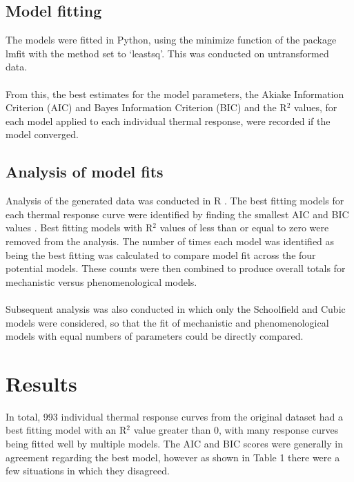 \documentclass[11pt]{article}
\begin{document}
\subsection{Model fitting}
The models were fitted in Python, using the minimize function of the package lmfit with the method set to `leastsq'. This was conducted on untransformed data. 
\\
\\
From this, the best estimates for the model parameters, the Akiake Information Criterion (AIC) and Bayes Information Criterion (BIC) and the R\begin{math}^2\end{math} values, for each model applied to each individual thermal response, were recorded if the model converged.

\subsection{Analysis of model fits}
Analysis of the generated data was conducted in R \cite{R}. The best fitting models for each thermal response curve were identified by finding the smallest AIC and BIC values \cite{johnson2004model}. Best fitting models with R\begin{math}^2\end{math} values of less than or equal to zero were removed from the analysis. The number of times each model was identified as being the best fitting was calculated to compare model fit across the four potential models. These counts were then combined to produce overall totals for mechanistic versus phenomenological models.
\\
\\
Subsequent analysis was also conducted in which only the Schoolfield and Cubic models were considered, so that the fit of mechanistic and phenomenological models with equal numbers of parameters could be directly compared. 
  
\section{Results}
In total, 993 individual thermal response curves from the original dataset had a best fitting model with an R\begin{math}^2\end{math} value greater than 0, with many response curves being fitted well by multiple models. The AIC and BIC scores were generally in agreement regarding the best model, however as shown in Table 1 there were a few situations in which they disagreed.
\end{document}
